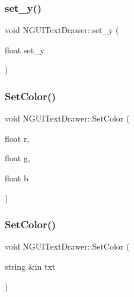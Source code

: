 \subsubsection{\texorpdfstring{set\+\_\+y()}{set\_y()}}
{\footnotesize\ttfamily void N\+G\+U\+I\+Text\+Drawer\+::set\+\_\+y (\begin{DoxyParamCaption}\item[{float}]{set\+\_\+y }\end{DoxyParamCaption})}

\hypertarget{class_n_g_u_i_text_drawer_a0f86790d4e3c9674f1b8fe4bb0323980}{}\label{class_n_g_u_i_text_drawer_a0f86790d4e3c9674f1b8fe4bb0323980} 
\subsubsection{\texorpdfstring{Set\+Color()}{SetColor()}\hspace{0.1cm}{\footnotesize\ttfamily [1/2]}}
{\footnotesize\ttfamily void N\+G\+U\+I\+Text\+Drawer\+::\+Set\+Color (\begin{DoxyParamCaption}\item[{float}]{r,  }\item[{float}]{g,  }\item[{float}]{b }\end{DoxyParamCaption})}

\hypertarget{class_n_g_u_i_text_drawer_ab44402c0d86886a2be0eac3b932aebf1}{}\label{class_n_g_u_i_text_drawer_ab44402c0d86886a2be0eac3b932aebf1} 
\subsubsection{\texorpdfstring{Set\+Color()}{SetColor()}\hspace{0.1cm}{\footnotesize\ttfamily [2/2]}}
{\footnotesize\ttfamily void N\+G\+U\+I\+Text\+Drawer\+::\+Set\+Color (\begin{DoxyParamCaption}\item[{string \&in}]{txt }\end{DoxyParamCaption})}

\hypertarget{class_n_g_u_i_text_drawer_a7b8e0e5be61cbaadfe21c51776dc3a6b}{}\label{class_n_g_u_i_text_drawer_a7b8e0e5be61cbaadfe21c51776dc3a6b} 
